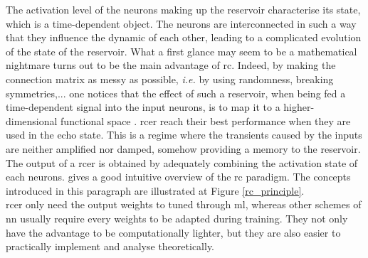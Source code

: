 The activation level of the neurons making up the reservoir characterise its state, which is a time-dependent object. The neurons are interconnected in such a way that they influence the dynamic of each other, leading to a complicated evolution of the state of the reservoir. What a first glance may seem to be a mathematical nightmare turns out to be the main advantage of \gls{rc}. Indeed, by making the connection matrix as messy as possible, \textit{i.e.} by using randomness, breaking symmetries,... one notices that the effect of such a reservoir, when being fed a time-dependent signal into the input neurons, is to map it to a higher-dimensional functional space	. \gls{rcer} reach their best performance when they are used in the echo state. This is a regime where the transients caused by the inputs are neither amplified nor damped, somehow providing a memory to the reservoir. The output of a \gls{rcer} is obtained by adequately combining the activation state of each neurons. \cite{Goudarzi2014ACS} gives a good intuitive overview of the \gls{rc} paradigm. The concepts introduced in this paragraph are illustrated at Figure \ref{rc_principle}.\\

\gls{rcer} only need the output weights to tuned through \gls{ml}, whereas other schemes of \gls{nn} usually require every weights to be adapted during training. They not only have the advantage to be computationally lighter, but they are also easier to practically implement and analyse theoretically.
